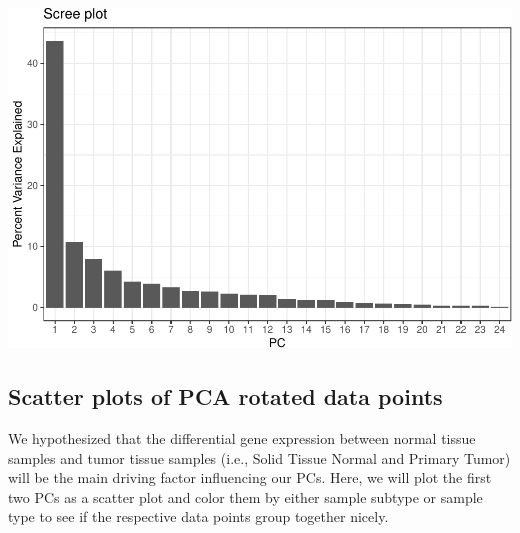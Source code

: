 \documentclass[
]{article}
\begin{document}
\includegraphics{LiuKevin_Final_Project_files/figure-latex/unnamed-chunk-11-1.pdf}

\newpage

\hypertarget{scatter-plots-of-pca-rotated-data-points}{%
\subsection{Scatter plots of PCA rotated data
points}\label{scatter-plots-of-pca-rotated-data-points}}

We hypothesized that the differential gene expression between normal
tissue samples and tumor tissue samples (i.e., Solid Tissue Normal and
Primary Tumor) will be the main driving factor influencing our PCs.
Here, we will plot the first two PCs as a scatter plot and color them by
either sample subtype or sample type to see if the respective data
points group together nicely.
\end{document}
